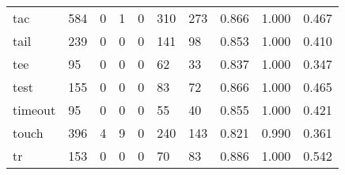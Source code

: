 \begin{longtable}{lp{2.0cm}p{2.0cm}p{2.0cm}p{2.0cm}p{2.0cm}p{2.0cm}p{2.0cm}p{2.0cm}p{2.0cm}}
tac       &                    584 &                                             0 &                                            1 &                                           0 &                                          310 &                                        273 &                                0.866 &                                  1.000 &                                0.467 \\
tail      &                    239 &                                             0 &                                            0 &                                           0 &                                          141 &                                         98 &                                0.853 &                                  1.000 &                                0.410 \\
tee       &                     95 &                                             0 &                                            0 &                                           0 &                                           62 &                                         33 &                                0.837 &                                  1.000 &                                0.347 \\
test      &                    155 &                                             0 &                                            0 &                                           0 &                                           83 &                                         72 &                                0.866 &                                  1.000 &                                0.465 \\
timeout   &                     95 &                                             0 &                                            0 &                                           0 &                                           55 &                                         40 &                                0.855 &                                  1.000 &                                0.421 \\
touch     &                    396 &                                             4 &                                            9 &                                           0 &                                          240 &                                        143 &                                0.821 &                                  0.990 &                                0.361 \\
tr        &                    153 &                                             0 &                                            0 &                                           0 &                                           70 &                                         83 &                                0.886 &                                  1.000 &                                0.542 \\

\end{longtable}
